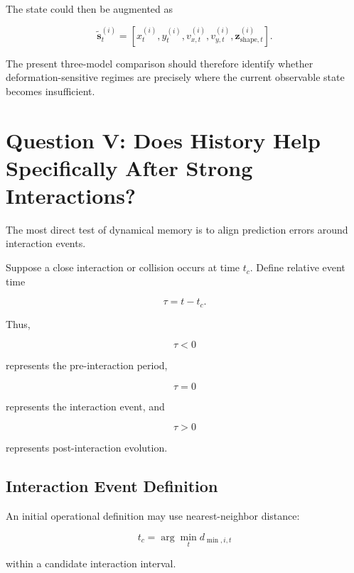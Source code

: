 \documentclass[11pt]{article}
\begin{document}
The state could then be augmented as

\begin{equation}
\tilde{\mathbf{s}}_t^{(i)}
=
\left[
x_t^{(i)},
y_t^{(i)},
v_{x,t}^{(i)},
v_{y,t}^{(i)},
\mathbf{z}_{\mathrm{shape},t}^{(i)}
\right].
\end{equation}

The present three-model comparison should therefore identify whether deformation-sensitive regimes are precisely where the current observable state becomes insufficient.

\section{Question V: Does History Help Specifically After Strong Interactions?}

The most direct test of dynamical memory is to align prediction errors around interaction events.

Suppose a close interaction or collision occurs at time \(t_c\). Define relative event time

\begin{equation}
\tau
=
t-t_c.
\end{equation}

Thus,

\begin{equation}
\tau<0
\end{equation}

represents the pre-interaction period,

\begin{equation}
\tau=0
\end{equation}

represents the interaction event, and

\begin{equation}
\tau>0
\end{equation}

represents post-interaction evolution.

\subsection{Interaction Event Definition}

An initial operational definition may use nearest-neighbor distance:

\begin{equation}
t_c
=
\arg\min_t
d_{\min,i,t}
\end{equation}

within a candidate interaction interval.
\end{document}
